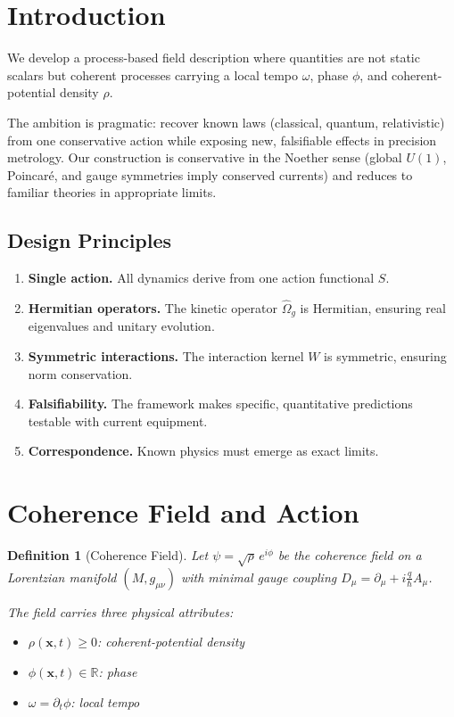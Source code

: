 \documentclass[11pt, a4paper]{article}
\newtheorem{definition}{Definition}[section]
\begin{document}
\tableofcontents

\section{Introduction}

We develop a process-based field description where quantities are not static
scalars but coherent processes carrying a local tempo $\omega$, phase $\phi$,
and coherent-potential density $\rho$.

The ambition is pragmatic: recover known laws (classical, quantum,
relativistic) from one conservative action while exposing new, falsifiable
effects in precision metrology. Our construction is conservative in the
Noether sense (global $U(1)$, Poincar\'e, and gauge symmetries imply
conserved currents) and reduces to familiar theories in appropriate limits.

\subsection{Design Principles}

\begin{enumerate}[label=\arabic*.]
  \item \textbf{Single action.} All dynamics derive from one action
        functional $S$.
  \item \textbf{Hermitian operators.} The kinetic operator $\hat{\Omega}_g$
        is Hermitian, ensuring real eigenvalues and unitary evolution.
  \item \textbf{Symmetric interactions.} The interaction kernel $W$ is
        symmetric, ensuring norm conservation.
  \item \textbf{Falsifiability.} The framework makes specific, quantitative
        predictions testable with current equipment.
  \item \textbf{Correspondence.} Known physics must emerge as exact limits.
\end{enumerate}

\section{Coherence Field and Action}

\begin{definition}[Coherence Field]
Let $\psi = \sqrt{\rho}\, e^{i\phi}$ be the coherence field on a
Lorentzian manifold $(M, g_{\mu\nu})$ with minimal gauge coupling
$D_\mu = \partial_\mu + i\frac{q}{\hbar}A_\mu$.

The field carries three physical attributes:
\begin{itemize}[nosep]
  \item $\rho(\mathbf{x}, t) \geq 0$: coherent-potential density
  \item $\phi(\mathbf{x}, t) \in \mathbb{R}$: phase
  \item $\omega = \partial_t \phi$: local tempo
\end{itemize}
\end{definition}
\end{document}
